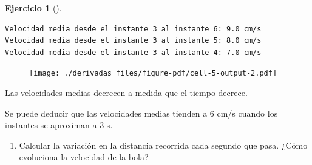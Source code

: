 \documentclass[
  a4paper,
]{scrreport}
\newenvironment{Shaded}{\begin{snugshade}}{\end{snugshade}}
\newcommand{\ControlFlowTok}[1]{\textcolor[rgb]{0.00,0.23,0.31}{#1}}
\newcommand{\FloatTok}[1]{\textcolor[rgb]{0.68,0.00,0.00}{#1}}
\newcommand{\FunctionTok}[1]{\textcolor[rgb]{0.28,0.35,0.67}{#1}}
\newcommand{\KeywordTok}[1]{\textcolor[rgb]{0.00,0.23,0.31}{#1}}
\newcommand{\NormalTok}[1]{\textcolor[rgb]{0.00,0.23,0.31}{#1}}
\newcommand{\OperatorTok}[1]{\textcolor[rgb]{0.37,0.37,0.37}{#1}}
\newcommand{\SpecialCharTok}[1]{\textcolor[rgb]{0.37,0.37,0.37}{#1}}
\newcommand{\StringTok}[1]{\textcolor[rgb]{0.13,0.47,0.30}{#1}}
\providecommand{\tightlist}{%
  \setlength{\itemsep}{0pt}\setlength{\parskip}{0pt}}\usepackage{longtable,booktabs,array}
\theoremstyle{definition}
\newtheorem{exercise}{Ejercicio}[chapter]
\theoremstyle{remark}
\begin{document}
\begin{exercise}[]
\begin{tcolorbox}
\begin{verbatim}
Velocidad media desde el instante 3 al instante 6: 9.0 cm/s
Velocidad media desde el instante 3 al instante 5: 8.0 cm/s
Velocidad media desde el instante 3 al instante 4: 7.0 cm/s
\end{verbatim}

\begin{figure}[H]

{\centering \texttt{[image: ./derivadas\_files/figure-pdf/cell-5-output-2.pdf]}

}

\end{figure}

Las velocidades medias decrecen a medida que el tiempo decrece.

Se puede deducir que las velocidades medias tienden a \(6\) cm/s cuando
los instantes se aproximan a \(3\) s.

\end{tcolorbox}

\begin{enumerate}
\def\labelenumi{\alph{enumi}.}
\setcounter{enumi}{3}
\tightlist
\item
  Calcular la variación en la distancia recorrida cada segundo que pasa.
  ¿Cómo evoluciona la velocidad de la bola?
\end{enumerate}

\begin{tcolorbox}[enhanced jigsaw, toprule=.15mm, arc=.35mm, bottomrule=.15mm, titlerule=0mm, bottomtitle=1mm, opacitybacktitle=0.6, colbacktitle=quarto-callout-tip-color!10!white, colframe=quarto-callout-tip-color-frame, opacityback=0, title=\textcolor{quarto-callout-tip-color}{\faLightbulb}\hspace{0.5em}{Solución}, breakable, colback=white, toptitle=1mm, leftrule=.75mm, coltitle=black, rightrule=.15mm, left=2mm]

\begin{Shaded}
\end{Shaded}


\end{tcolorbox}
\end{exercise}
\end{document}
